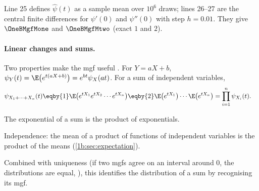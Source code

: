 
Line 25 defines $\hat\psi(t)$ as a sample mean over $10^6$ draws; lines 26--27
are the central finite differences for $\psi'(0)$ and $\psi''(0)$ with step
$h=0.01$. They give $\OneBMgfMone$ and $\OneBMgfMtwo$ (exact $1$ and $2$).

\paragraph{Linear changes and sums.}
Two properties make the mgf useful . For
$Y=aX+b$, $\psi_Y(t)=\E\bigl(e^{t(aX+b)}\bigr)=e^{bt}\psi_X(at)$. For a sum of
independent variables,
\begin{align}
  \psi_{X_1+\dots+X_n}(t)
  &\eqby{1} \E\bigl(e^{tX_1}e^{tX_2}\cdots e^{tX_n}\bigr)
   \eqby{2} \E\bigl(e^{tX_1}\bigr)\cdots\E\bigl(e^{tX_n}\bigr)
   = \prod_{i=1}^n\psi_{X_i}(t) .
  \label{1b:eq:mgf-sum}
\end{align}
\begin{explain}
  \item The exponential of a sum is the product of exponentials.
  \item Independence: the mean of a product of functions of independent
        variables is the product of the means (\cref{1b:sec:expectation}).
\end{explain}
Combined with uniqueness (if two mgfs agree on an interval around $0$, the
distributions are equal, ), this identifies the
distribution of a sum by recognising its mgf.

